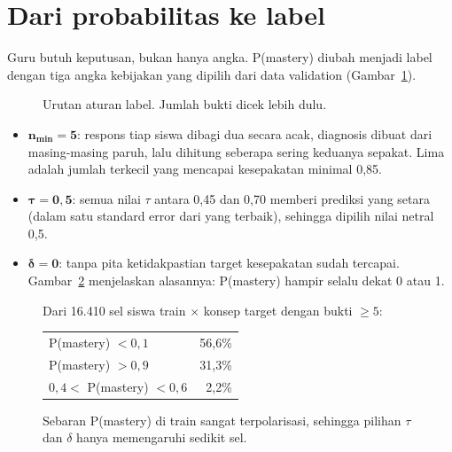 \documentclass[11pt,a4paper]{article}
\begin{document}
\section{Dari probabilitas ke label}
\label{sec:label}

Guru butuh keputusan, bukan hanya angka. P(mastery) diubah menjadi label dengan tiga angka kebijakan yang dipilih dari
data validation (Gambar~\ref{fig:policy}).

\begin{figure}[h]
  \centering
  \resizebox{0.98\linewidth}{!}{}
  \caption{Urutan aturan label. Jumlah bukti dicek lebih dulu.}
  \label{fig:policy}
\end{figure}

\begin{itemize}
  \item $\boldsymbol{n_{\min}=5}$: respons tiap siswa dibagi dua secara acak, diagnosis dibuat dari masing-masing
        paruh, lalu dihitung seberapa sering keduanya sepakat. Lima adalah jumlah terkecil yang mencapai kesepakatan
        minimal 0,85.
  \item $\boldsymbol{\tau=0{,}5}$: semua nilai $\tau$ antara 0,45 dan 0,70 memberi prediksi yang setara (dalam satu
        standard error dari yang terbaik), sehingga dipilih nilai netral 0,5.
  \item $\boldsymbol{\delta=0}$: tanpa pita ketidakpastian target kesepakatan sudah tercapai. Gambar~\ref{fig:pihist}
        menjelaskan alasannya: P(mastery) hampir selalu dekat 0 atau 1.
\end{itemize}

\begin{figure}[h]
  \centering
  \setlength\figH{4.2cm}
  \begin{minipage}[c]{0.58\linewidth}\end{minipage}\hfill
  \begin{minipage}[c]{0.38\linewidth}\small
    Dari 16.410 sel siswa train $\times$ konsep target dengan bukti $\ge5$:\\[3pt]
    \begin{tabular}{@{}lr@{}}
      \toprule
      P(mastery) $<0{,}1$ & 56,6\% \\
      P(mastery) $>0{,}9$ & 31,3\% \\
      $0{,}4<$ P(mastery) $<0{,}6$ & 2,2\% \\
      \bottomrule
    \end{tabular}
  \end{minipage}
  \caption{Sebaran P(mastery) di train sangat terpolarisasi, sehingga pilihan $\tau$ dan $\delta$ hanya memengaruhi
  sedikit sel.}
  \label{fig:pihist}
\end{figure}
\end{document}
